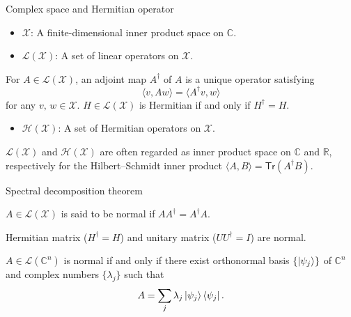 \documentclass{beamer}
\newcommand{\Tr}{\mathsf{Tr}}
\newcommand\emm[1]{\textcolor{redorange}{{#1}}}
\begin{document}
\begin{frame}{Complex space and Hermitian operator}
\begin{itemize}
\item $\mathcal{X}$: A finite-dimensional inner product space on $\mathbb{C}$.
\item $\mathcal{L}(\mathcal{X})$: A set of linear operators on $\mathcal{X}$.
\end{itemize}

\vspace{1em}
For $A\in\mathcal{L}(\mathcal{X})$, an \emm{adjoint} map $A^\dagger$ of $A$ is a unique operator satisfying
\begin{equation*}
\langle v, Aw\rangle = \langle A^\dagger v, w\rangle
\end{equation*}
for any $v,\,w\in\mathcal{X}$.
$H\in\mathcal{L}(\mathcal{X})$ is Hermitian if and only if $H^\dagger = H$.

\vspace{1em}
\begin{itemize}
\item $\mathcal{H}(\mathcal{X})$: A set of Hermitian operators on $\mathcal{X}$.
\end{itemize}

\vspace{2em}
$\mathcal{L}(\mathcal{X})$ and $\mathcal{H}(\mathcal{X})$ are often regarded as inner product space on $\mathbb{C}$ and $\mathbb{R}$, respectively
for the Hilbert--Schmidt inner product $\langle A, B\rangle = \Tr(A^\dagger B)$.
\end{frame}

\begin{frame}{Spectral decomposition theorem}
\begin{definition}
$A\in\mathcal{L}(\mathcal{X})$ is said to be \emm{normal} if $AA^\dagger = A^\dagger A$.
\end{definition}

\vspace{1em}
Hermitian matrix ($H^\dagger = H$) and unitary matrix ($UU^\dagger = I$) are normal.

\vspace{2em}
\begin{theorem}
$A\in \mathcal{L}(\mathbb{C}^n)$ is \emm{normal} if and only if there exist orthonormal basis $\{\ket{\psi_j}\}$ of $\mathbb{C}^n$ and complex numbers $\{\lambda_j\}$ such that
\begin{equation*}
A=\sum_j \lambda_j\ket{\psi_j}\bra{\psi_j}.
\end{equation*}
\end{theorem}
\end{frame}
\end{document}
